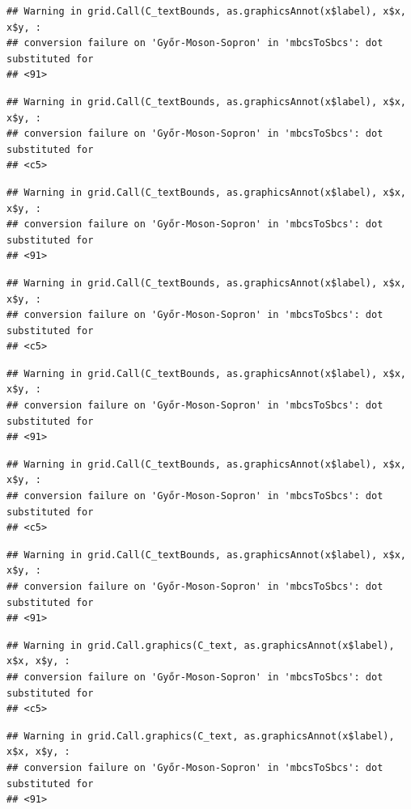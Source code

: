 \documentclass[
]{book}
\begin{document}
\begin{verbatim}
## Warning in grid.Call(C_textBounds, as.graphicsAnnot(x$label), x$x, x$y, :
## conversion failure on 'Győr-Moson-Sopron' in 'mbcsToSbcs': dot substituted for
## <91>
\end{verbatim}

\begin{verbatim}
## Warning in grid.Call(C_textBounds, as.graphicsAnnot(x$label), x$x, x$y, :
## conversion failure on 'Győr-Moson-Sopron' in 'mbcsToSbcs': dot substituted for
## <c5>
\end{verbatim}

\begin{verbatim}
## Warning in grid.Call(C_textBounds, as.graphicsAnnot(x$label), x$x, x$y, :
## conversion failure on 'Győr-Moson-Sopron' in 'mbcsToSbcs': dot substituted for
## <91>
\end{verbatim}

\begin{verbatim}
## Warning in grid.Call(C_textBounds, as.graphicsAnnot(x$label), x$x, x$y, :
## conversion failure on 'Győr-Moson-Sopron' in 'mbcsToSbcs': dot substituted for
## <c5>
\end{verbatim}

\begin{verbatim}
## Warning in grid.Call(C_textBounds, as.graphicsAnnot(x$label), x$x, x$y, :
## conversion failure on 'Győr-Moson-Sopron' in 'mbcsToSbcs': dot substituted for
## <91>
\end{verbatim}

\begin{verbatim}
## Warning in grid.Call(C_textBounds, as.graphicsAnnot(x$label), x$x, x$y, :
## conversion failure on 'Győr-Moson-Sopron' in 'mbcsToSbcs': dot substituted for
## <c5>
\end{verbatim}

\begin{verbatim}
## Warning in grid.Call(C_textBounds, as.graphicsAnnot(x$label), x$x, x$y, :
## conversion failure on 'Győr-Moson-Sopron' in 'mbcsToSbcs': dot substituted for
## <91>
\end{verbatim}

\begin{verbatim}
## Warning in grid.Call.graphics(C_text, as.graphicsAnnot(x$label), x$x, x$y, :
## conversion failure on 'Győr-Moson-Sopron' in 'mbcsToSbcs': dot substituted for
## <c5>
\end{verbatim}

\begin{verbatim}
## Warning in grid.Call.graphics(C_text, as.graphicsAnnot(x$label), x$x, x$y, :
## conversion failure on 'Győr-Moson-Sopron' in 'mbcsToSbcs': dot substituted for
## <91>
\end{verbatim}
\end{document}
